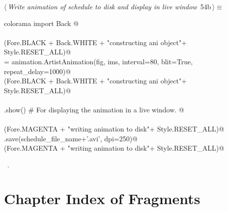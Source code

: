 \documentclass[11.5pt]{report}
\begin{document}
\vspace{-0.8cm} \newchunk
\begin{flushleft} \small\label{scrap69}\raggedright\small
{} $\langle\,${\itshape Write animation of schedule to disk and display in live window}\nobreak\ {\footnotesize {54b}}$\,\rangle\equiv$
\vspace{-1ex}
\begin{list}{}{} \item
\mbox{}\verb@from colorama import Back @\\
\mbox{}\verb@@\\
\mbox{}\verb@debug(Fore.BLACK + Back.WHITE + "\nStarted constructing ani object"+ Style.RESET_ALL)@\\
\mbox{}\verb@ani = animation.ArtistAnimation(fig, ims, interval=80, blit=True, repeat_delay=1000)@\\
\mbox{}\verb@debug(Fore.BLACK + Back.WHITE + "\nFinished constructing ani object"+ Style.RESET_ALL)@\\
\mbox{}\verb@@\\
\mbox{}\verb@plt.show() # For displaying the animation in a live window. @\\
\mbox{}\verb@@\\
\mbox{}\verb@debug(Fore.MAGENTA + "\nStarted writing animation to disk"+ Style.RESET_ALL)@\\
\mbox{}\verb@ani.save(schedule_file_name+'.avi', dpi=250)@\\
\mbox{}\verb@debug(Fore.MAGENTA + "\nFinished writing animation to disk"+ Style.RESET_ALL)@\\
\mbox{}\verb@@{\NWsep}
\end{list}
\vspace{-1.5ex}
\footnotesize
\begin{list}{}{\setlength{\itemsep}{-\parsep}\setlength{\itemindent}{-\leftmargin}}
\item \NWtxtMacroRefIn\ .

\item{}
\end{list}
\vspace{4ex}
\end{flushleft}
\section{Chapter Index of Fragments}
\end{document}
